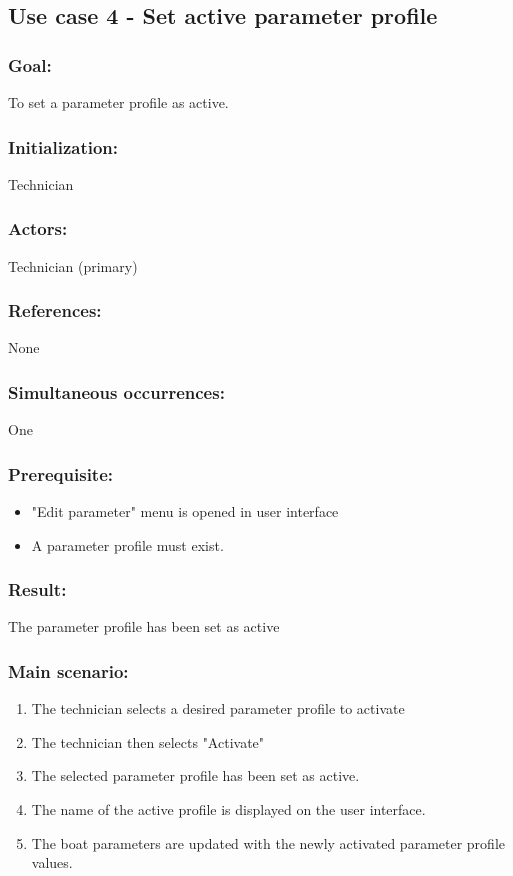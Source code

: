 \begin{framed}
	\subsection{Use case 4 - Set active parameter profile}
	\subsubsection*{Goal:}
	To set a parameter profile as active.
	
	\subsubsection*{Initialization:}
	Technician
	
	\subsubsection*{Actors:}
	Technician (primary)
	
	\subsubsection*{References:}
	None
	
	\subsubsection*{Simultaneous occurrences:}
	One
	
	\subsubsection*{Prerequisite:}
	\begin{itemize}
		\item "Edit parameter" menu is opened in user interface
		\item A parameter profile must exist.
	\end{itemize}

	\subsubsection*{Result:}
	The parameter profile has been set as active
	
	\subsubsection*{Main scenario:}
	\begin{enumerate}
		\item The technician selects a desired parameter profile to activate
		\item The technician then selects "Activate"
		\item The selected parameter profile has been set as active.
		\item The name of the active profile is displayed on the user interface.
		\item The boat parameters are updated with the newly activated parameter profile values.
	\end{enumerate}
\end{framed}

